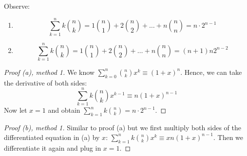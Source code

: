 \documentclass[12pt]{article}
\begin{document}
\begin{theorem} Observe:
    \begin{enumerate}[label=(\alph*)]
        \item \[\sum_{k=1}^{n}k\binom{n}{k}=1\binom{n}{1}+2\binom{n}{2}+\dots +n\binom{n}{n}=n\cdot 2^{n-1}\]
        \item \[\sum_{k=1}^{n}k\binom{n}{k}=1\binom{n}{1}+2\binom{n}{2}+\dots +n\binom{n}{n}=(n+1)n2^{n-2}\]
    \end{enumerate}
\end{theorem}
\ontangent{

    \begin{enumerate}[label=(\alph*)]
        \item \[\begin{tikzcd}[ampersand replacement=\&,cramped,sep=tiny]
            {0\cdot 1} \\
            0\cdot1 \& 1\cdot1 \&\&\&\& {=1=1\times 1} \\
            0\cdot1 \& 1\cdot2 \& 2\cdot1 \&\&\& {=4=2\times 2} \\
            0\cdot1 \& 1\cdot3 \& 2\cdot3 \& 3\cdot1 \&\& {=12=3\times 4} \\
            0\cdot1 \& 1\cdot4 \& 2\cdot6 \& 3\cdot4 \& 4\cdot1 \& {=32=4\times 8}
        \end{tikzcd}\]
        \item \[\begin{tikzcd}[ampersand replacement=\&,cramped,sep=tiny]
            {0\cdot 1} \\
            0\cdot1 \& 1\cdot1 \&\&\&\& {=1=1\times 1} \\
            0\cdot1 \& 1\cdot2 \& 4\cdot1 \&\&\& {=6=3\times 2} \\
            0\cdot1 \& 1\cdot3 \& 4\cdot3 \& 9\cdot1 \&\& {=24=6\times 4} \\
            0\cdot1 \& 1\cdot4 \& 4\cdot6 \& 9\cdot4 \& 16\cdot1 \& {=80=10\times 8}
        \end{tikzcd}\]
    \end{enumerate}
}
\begin{proof}[Proof (a), method 1]
    We know $\sum_{k=0}^{n}\binom{n}{k}x^k \equiv (1+x)^n$. Hence, we can take  the derivative of both sides: \[\sum_{k=1}^{n}k\binom{n}{k}x^{k-1}\equiv n(1+x)^{n-1}\]
    Now let $x=1$ and obtain $\sum_{k=1}^{n}k\binom{n}{k}=n\cdot 2^{n-1}$.
\end{proof}
\begin{proof}[Proof (b), method 1]
    Similar to proof (a) but we first multiply both sides of the differentiated equation in (a) by $x$: $\sum_{k=1}^{n}k\binom{n}{k}x^{k}\equiv xn(1+x)^{n-1}$. Then we differentiate it again and plug in $x=1$.
\end{proof}
\end{document}
